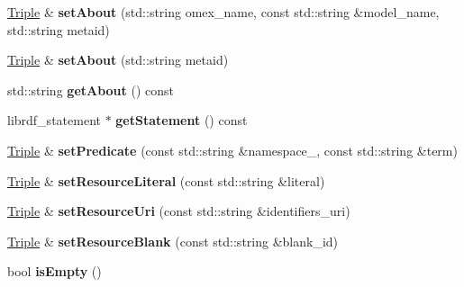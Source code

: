 \begin{DoxyCompactItemize}
\hyperlink{classomexmeta_1_1Triple}{Triple} \& {\bfseries set\+About} (std\+::string omex\+\_\+name, const std\+::string \&model\+\_\+name, std\+::string metaid)
\item 
\mbox{\label{classomexmeta_1_1Triple_a6329b09efb05005d248790e8a3d507f3}} 
\hyperlink{classomexmeta_1_1Triple}{Triple} \& {\bfseries set\+About} (std\+::string metaid)
\item 
\mbox{\label{classomexmeta_1_1Triple_a69df88d19e2f9077fccfa9543dadd15f}} 
std\+::string {\bfseries get\+About} () const
\item 
\mbox{\label{classomexmeta_1_1Triple_a886240fe50becaaa47ca171f2d454ba4}} 
librdf\+\_\+statement $\ast$ {\bfseries get\+Statement} () const
\item 
\mbox{\label{classomexmeta_1_1Triple_a57b4521321178af38415e76cd483207e}} 
\hyperlink{classomexmeta_1_1Triple}{Triple} \& {\bfseries set\+Predicate} (const std\+::string \&namespace\+\_\+, const std\+::string \&term)
\item 
\mbox{\label{classomexmeta_1_1Triple_a7358812badc8d0d5589a0165af4ad375}} 
\hyperlink{classomexmeta_1_1Triple}{Triple} \& {\bfseries set\+Resource\+Literal} (const std\+::string \&literal)
\item 
\mbox{\label{classomexmeta_1_1Triple_ae6836c6e9d06a310a120345aa95a4daa}} 
\hyperlink{classomexmeta_1_1Triple}{Triple} \& {\bfseries set\+Resource\+Uri} (const std\+::string \&identifiers\+\_\+uri)
\item 
\mbox{\label{classomexmeta_1_1Triple_a90ffe9b74d354cc3fe3132a07546f6d1}} 
\hyperlink{classomexmeta_1_1Triple}{Triple} \& {\bfseries set\+Resource\+Blank} (const std\+::string \&blank\+\_\+id)
\item 
\mbox{\label{classomexmeta_1_1Triple_a34832780748d58b0fddea6f6f079217a}} 
bool {\bfseries is\+Empty} ()
\item 
\mbox{\label{classomexmeta_1_1Triple_a1a99a566a9d1883c6329a023f4dbc056}} 

\end{DoxyCompactItemize}
